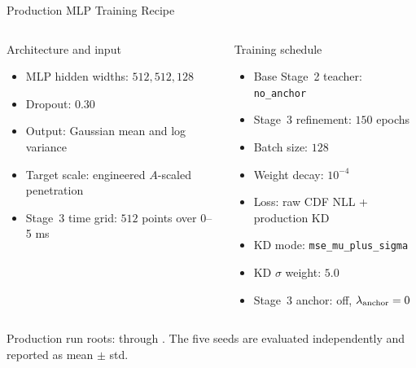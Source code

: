 \documentclass[UTF8,aspectratio=169]{ctexbeamer}
\begin{document}
\begin{frame}{Production MLP Training Recipe}
\small
\begin{columns}[T]
\begin{block}{Architecture and input}
\begin{itemize}\setlength\itemsep{3pt}
  \item MLP hidden widths: \(512,512,128\)
  \item Dropout: \(0.30\)
  \item Output: Gaussian mean and log variance
  \item Target scale: engineered \(A\)-scaled penetration
  \item Stage~3 time grid: \(512\) points over 0--5 ms
\end{itemize}
\end{block}

\begin{block}{Training schedule}
\begin{itemize}\setlength\itemsep{3pt}
  \item Base Stage~2 teacher: \texttt{no\_anchor}
  \item Stage~3 refinement: \(150\) epochs
  \item Batch size: \(128\)
  \item Weight decay: \(10^{-4}\)
  \item Loss: raw CDF NLL + production KD
  \item KD mode: \texttt{mse\_mu\_plus\_sigma}
  \item KD \(\sigma\) weight: \(5.0\)
  \item Stage~3 anchor: off, \(\lambda_{\rm anchor}=0\)
\end{itemize}
\end{block}
\end{columns}

\vspace{0.45em}
\footnotesize
Production run roots:
 through
. The five seeds are evaluated independently and reported as mean \(\pm\) std.
\end{frame}
\end{document}
